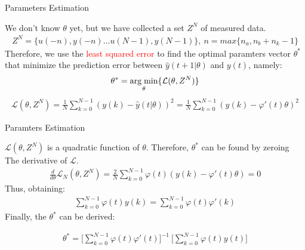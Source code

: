 \documentclass[aspectratio=169,hyperref={pdfpagelabels=false}]{beamer}
\begin{document}
\begin{frame}{Parameters Estimation}
      \begin{block}{}
        We don't know $\theta$ yet, but we have collected a set $Z^N$ of measured data.
        \begin{align*}
          Z^N = \{u(-n), y(-n)\dots u(N-1), y(N-1) \}, \: n = max\{n_a,n_{b}+n_{k}-1\}
        \end{align*}
      Therefore, we use the \textcolor{red}{least squared error} to find the optimal paramters vector $\theta^*$ that minimize the prediction error between $\hat{y}(t+1|\theta)$ and $y(t)$, namely: 
      \begin{align*}
        \theta^* = \underset{\theta}{\text{arg\;min}} \{\mathcal{L}(\theta, Z^N)\}
      \end{align*}
      \begin{align*}
        \mathcal{L}(\theta, Z^N) = \frac{1}{N}\sum_{k=0}^{N-1}(y(k)-\hat{y}(t|\theta))^2 = \frac{1}{N}\sum_{k=0}^{N-1}(y(k)-\varphi'(t)\theta)^2 
      \end{align*}
    \end{block}
\end{frame}

\begin{frame}{Paramters Estimation}
  \begin{block}{}
      $\mathcal{L}(\theta, Z^N)$ is a quadratic function of $\theta$. Therefore, $\theta^*$ can be found by zeroing The derivative of $\mathcal{L}$.
  \begin{align*}
    \frac{d}{d\theta} \mathcal{L}_N(\theta, Z^N) = \frac{2}{N}\sum_{k=0}^{N-1}\varphi(t)(y(k)-\varphi'(t)\theta)  = 0 
  \end{align*}
Thus, obtaining: 
\begin{align*}
  \sum_{k=0}^{N-1}\varphi(t)y(k) = \sum_{k=0}^{N-1}\varphi(t)\varphi'(k)
\end{align*}
Finally, the $\theta^*$ can be derived: 
\begin{center}
    \begin{align*}
      \boxed{\theta^* = \Biggr[\sum_{k=0}^{N-1}\varphi(t)\varphi'(t)\Biggr]^{-1} \: \Biggr[\sum_{k=0}^{N-1}\varphi(t)y(t)\Biggr]}
    \end{align*}
\end{center}
\end{block}
\end{frame}
\end{document}
